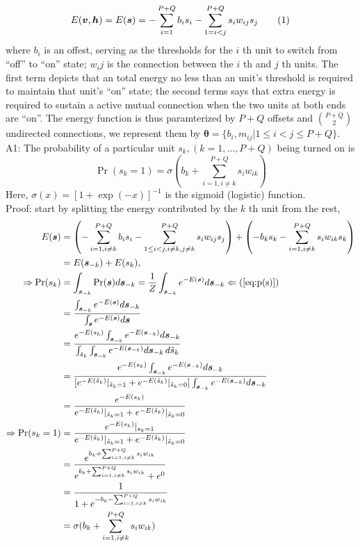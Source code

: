 \documentclass[11pt]{article}
\newcommand\numberthis{\addtocounter{equation}{1}\tag{\theequation}}
\newcommand{\vh}{\boldsymbol{h}}
\newcommand{\vv}{\boldsymbol{v}}
\newcommand{\vs}{\boldsymbol{s}}
\newcommand{\pEC}{\boldsymbol{\theta}}
\begin{document}
\begin{align*}\label{eq:e(s)} %
    E(\vv, \vh) = E(\vs) = -\sum_{i=1}^{P+Q} b_i s_i - \sum_{1 = i < j}^{P+Q} s_i w_{ij} s_j \numberthis
\end{align*}
where $b_i$ is an offest, serving as the thresholds for the $i$ th unit to switch from ``off'' to ``on'' state; $w_ij$ is the connection between the $i$ th and $j$ th units. The first term depicts that an total energy no less than an unit's threshold is required to maintain that unit's ``on'' state; the second terms says that extra energy is required to sustain a active mutual connection when the two units at both ends are ``on''. The energy function is thus paramterized by $P+Q$ offsets and $P+Q \choose 2$ undirected connections, we represent them by $\pEC = \{b_i, m_{ij} | 1 \le i < j \le P+Q\}$. \\
A1: The probability of a particular unit $s_k, (k = 1, \dots, P+Q)$ being turned on is
\begin{equation}\label{eq:p(s_k=1)}
  \Pr(s_k = 1) = \sigma(b_k + \sum_{i=1, i \ne k}^{P+Q}{s_i w_{ik}})
\end{equation}
Here,  $\sigma(x) = [1 + \exp({-x})]^{-1}$ is the sigmoid (logistic) function. \\
Proof: start by splitting the energy contributed by the $k$ th unit from the rest,
\newcommand{\st}{\tilde{s}}
\begin{align*}
  E(\vs)
  & = \left( -\sum_{i=1, i \ne k}^{P+Q} b_i s_i - \sum_{1 \le i < j, i \ne k, j \ne k}^{P+Q} s_i w_{ij} s_j \right) + \left(-b_k s_k - \sum_{i=1, i \ne k}^{P+Q}s_i w_{ik} s_k \right) \\
  & = E(\vs_{-k}) + E(s_k), \\
  \Rightarrow \Pr(s_k)
  & = \int_{\vs_{-k}} \Pr(\vs) d\vs_{-k} = \frac{1}{Z} \int_{\vs_{-k}} e^{-E(\vs)} d\vs_{-k} \Leftarrow (\ref{eq:p(s)}) \\
  & = \frac{\int_{\vs_{-k}} e^{-E(\vs)} d\vs_{-k}}{\int_{\vs} e^{-E(\vs)} d\vs} \\
  & = \frac{e^{-E(s_k)} \int_{\vs_{-k}} e^{-E(\vs_{-k})} d\vs_{-k}}  {\int_{\st_k} \int_{\vs_{-k}} e^{-E(\vs_{-k})} d\vs_{-k}\,d\st_k} \\
  & = \frac{e^{-E(s_k)} \int_{\vs_{-k}} e^{-E(\vs_{-k})} d\vs_{-k}}  {[e^{-E(\st_k)}|_{\st_k=1} + e^{-E(\st_k)}|_{\st_k=0}] \int_{\vs_{-k}} e^{-E(\vs_{-k})} d\vs_{-k}} \\
  & = \frac{e^{-E(s_k)}}{e^{-E(\st_k)}|_{\st_k=1} + e^{-E(\st_k)}|_{\st_k=0}} \\
  \Rightarrow \Pr(s_k=1)
  & = \frac{e^{-E(s_k)}|_{s_k=1}}{e^{-E(\st_k)}|_{\st_k=1} + e^{-E(\st_k)}|_{\st_k=0}} \\
  & = \frac{e^{b_k + \sum_{i=1, i \ne k}^{P+Q}{s_i w_{ik}}}}{e^{b_k + \sum_{i=1, i \ne k}^{P+Q}{s_i w_{ik}}} + e^{0}} \\
  & = \frac{1}{1 + e^{-b_k - \sum_{i=1, i \ne k}^{P+Q}{s_i w_{ik}}}} \\
  & = \sigma(b_k + \sum_{i=1, i \ne k}^{P+Q}{s_i w_{ik}})
\end{align*}
\end{document}

